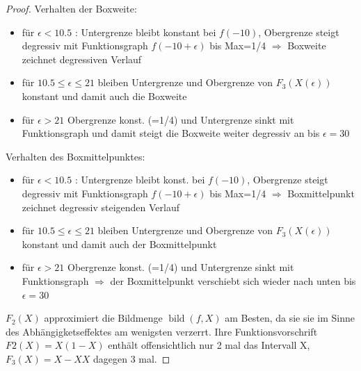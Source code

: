 \documentclass[12pt]{extreport} %
\begin{document}
\begin{enumerate}
		\begin{proof}
			Verhalten der Boxweite: 
			\begin{itemize}
				\item für $\epsilon < 10.5$ : Untergrenze bleibt konstant bei $f(-10)$, Obergrenze steigt degressiv mit Funktionsgraph $f(-10+\epsilon)$ bis Max=1/4 $\Rightarrow$ Boxweite zeichnet degressiven Verlauf
				\item für $10.5 \leq \epsilon \leq 21$ bleiben Untergrenze  und Obergrenze von $F_3(X(\epsilon))$ konstant und damit auch die Boxweite
				\item für $\epsilon>21$ Obergrenze konst. (=1/4) und Untergrenze sinkt mit Funktionsgraph und damit steigt die Boxweite weiter degressiv an bis $\epsilon=30$
			\end{itemize}
			Verhalten des Boxmittelpunktes:
			\begin{itemize}
				\item für $\epsilon <10.5$ : Untergrenze bleibt konst. bei $f(-10)$, Obergrenze steigt degressiv mit Funktionsgraph $f(-10+\epsilon)$ bis Max=1/4 $\Rightarrow$ Boxmittelpunkt zeichnet degressiv steigenden Verlauf
				\item für $10.5 \leq \epsilon \leq 21$ bleiben Untergrenze  und Obergrenze von $F_3(X(\epsilon))$ konstant und damit auch der Boxmittelpunkt
				\item für $\epsilon>21$ Obergrenze konst. (=1/4) und Untergrenze sinkt mit Funktionsgraph $\Rightarrow$ der Boxmittelpunkt verschiebt sich wieder nach unten bis $\epsilon=30$
			\end{itemize}
			$F_2(X)$ approximiert die Bildmenge $\operatorname{bild}(f,X)$ am Besten, da sie sie im Sinne des Abhängigketseffektes am wenigsten verzerrt. Ihre Funktionsvorschrift $F2(X)=X(1-X)$ enthält offensichtlich nur 2 mal das Intervall X, $F_3(X)=X-XX$ dagegen 3 mal.
		\end{proof}
\end{enumerate}
\end{document}
